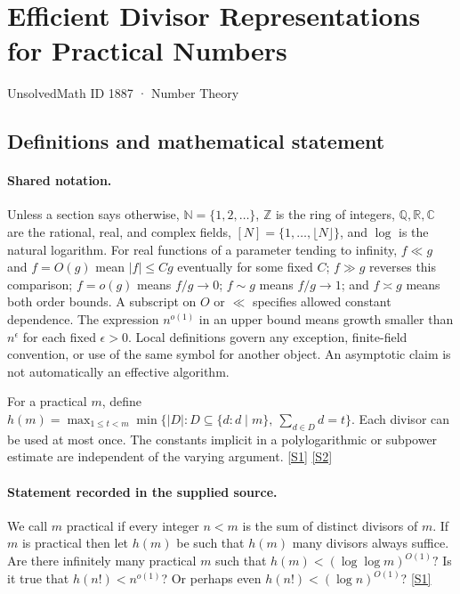 \documentclass[11pt,a4paper]{article}
\newcommand{\N}{\mathbb{N}}
\newcommand{\Z}{\mathbb{Z}}
\newcommand{\Q}{\mathbb{Q}}
\newcommand{\R}{\mathbb{R}}
\newcommand{\C}{\mathbb{C}}
\newcommand{\sref}[2]{\hyperlink{source:#1:#2}{[S#2]}}
\begin{document}

\setcounter{section}{1886}

\section{Efficient Divisor Representations for Practical Numbers}\label{1887}

{\small\sffamily UnsolvedMath ID 1887 · Number Theory}

\subsection{Definitions and mathematical statement}

\paragraph{Shared notation.}Unless a section says otherwise, $\N=\{1,2,\ldots\}$,
$\Z$ is the ring of integers, $\Q,\R,\C$ are the rational, real, and complex
fields, $[N]=\{1,\ldots,\lfloor N\rfloor\}$, and $\log$ is the natural
logarithm. For real functions of a parameter tending to infinity,
$f\ll g$ and $f=O(g)$ mean $|f|\leq Cg$ eventually for some fixed $C$;
$f\gg g$ reverses this comparison; $f=o(g)$ means $f/g\to0$;
$f\sim g$ means $f/g\to1$; and $f\asymp g$ means both order bounds.
A subscript on $O$ or $\ll$ specifies allowed constant dependence.
The expression $n^{o(1)}$ in an upper bound means growth smaller than
$n^\epsilon$ for each fixed $\epsilon>0$. Local definitions govern any
exception, finite-field convention, or use of the same symbol for another
object. An asymptotic claim is not automatically an effective algorithm.



For a practical $m$, define $h(m)=\max_{1\leq t<m}\min\{|D|:D\subseteq\{d:d\mid m\},\ \sum_{d\in D}d=t\}$. Each divisor can be used at most once. The constants implicit in a polylogarithmic or subpower estimate are independent of the varying argument. \sref{1887}{1} \sref{1887}{2}

\paragraph{Statement recorded in the supplied source.}
We call $m$ practical if every integer $n<m$ is the sum of distinct divisors of $m$. If $m$ is practical then let $h(m)$ be such that $h(m)$ many divisors always suffice.
Are there infinitely many practical $m$ such that $ h(m) < (\log\log m)^{O(1)}? $ Is it true that $h(n!)<n^{o(1)}$? Or perhaps even $h(n!)<(\log n)^{O(1)}$? \sref{1887}{1}
\end{document}
